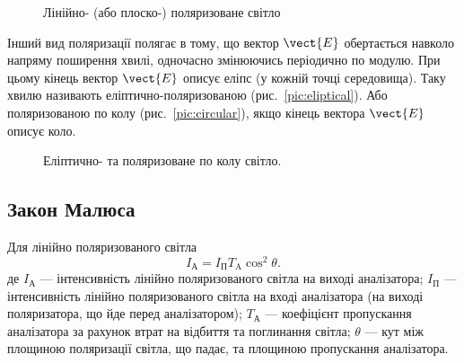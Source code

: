 \begin{figure}[h!]\centering
\begin{minipage}{0.45\linewidth}\centering

\caption{Лінійно- (або плоско-) поляризоване світло}
\label{pic:linear}
\end{minipage}
\begin{minipage}{0.45\linewidth}\centering

\label{pic:unpolarised}
\end{minipage}
\end{figure}

Інший вид поляризації полягає в тому, що вектор $ \vect{E} $
обертається навколо напряму поширення хвилі, одночасно змінюючись періодично по модулю. При цьому кінець
вектор $ \vect{E} $ описує еліпс (у кожній точці середовища). Таку
хвилю називають еліптично-поляризованою (рис.~\ref{pic:eliptical}). Або поляризованою по колу (рис.~\ref{pic:circular}), якщо кінець вектора $ \vect{E} $ описує коло.


\begin{figure}[h!]\centering
    
\caption{Еліптично- та поляризоване по колу світло.}
\label{pic:eliptical_polarisation}
\end{figure}





\subsection*{Закон Малюса}


Для лінійно поляризованого світла
\begin{equation}\label{eq:Malus_law_for_linear}
    I_\text{А} = I_\text{П}T_\text{A}\cos^2\theta.
\end{equation}
де  $ I_\text{А} $ --- інтенсивність лінійно поляризованого світла на виході аналізатора; $ I_\text{П} $ --- інтенсивність лінійно поляризованого світла на вході аналізатора (на виході поляризатора, що йде перед аналізатором); $ T_\text{А} $ --- коефіцієнт пропускання аналізатора за рахунок втрат на відбиття та поглинання світла; $\theta$ --- кут між площиною поляризації світла, що падає, та площиною пропускання аналізатора.

